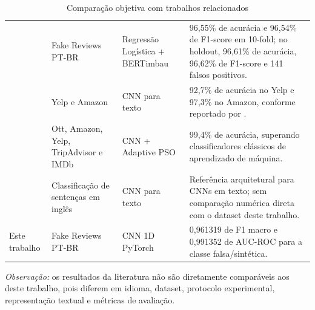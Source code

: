 \documentclass[12pt,a4paper]{article}
\begin{document}
\begin{table}[H]
\centering
\renewcommand{\arraystretch}{1.25}
\caption{Comparação objetiva com trabalhos relacionados}
\label{tab:comparacao}
\footnotesize
\begin{tabularx}{\textwidth}{@{} L{3.4cm} L{2.8cm} L{3.2cm} Y @{}}
\toprule
{} &
 &
 &
 \\
\midrule

 &
Fake Reviews PT-BR &
Regressão Logística + BERTimbau &
96,55\% de acurácia e 96,54\% de F1-score em 10-fold; no holdout, 96,61\% de acurácia, 96,62\% de F1-score e 141 falsos positivos. \\

\addlinespace
{} &
Yelp e Amazon &
CNN para texto &
92,7\% de acurácia no Yelp e 97,3\% no Amazon, conforme reportado por . \\

\addlinespace
{} &
Ott, Amazon, Yelp, TripAdvisor e IMDb &
CNN + Adaptive PSO &
99,4\% de acurácia, superando classificadores clássicos de aprendizado de máquina. \\

\addlinespace
{} &
Classificação de sentenças em inglês &
CNN para texto &
Referência arquitetural para CNNs em texto; sem comparação numérica direta com o dataset deste trabalho. \\

\addlinespace
Este trabalho &
Fake Reviews PT-BR &
CNN 1D PyTorch &
0,961319 de F1 macro e 0,991352 de AUC-ROC para a classe falsa/sintética. \\

\bottomrule
\end{tabularx}

\vspace{0.35em}
\begin{minipage}{\textwidth}
\footnotesize
\textit{Observação:} os resultados da literatura não são diretamente comparáveis aos deste trabalho, pois diferem em idioma, dataset, protocolo experimental, representação textual e métricas de avaliação.
\end{minipage}
\end{table}

\vspace{0.6em}
\end{document}
